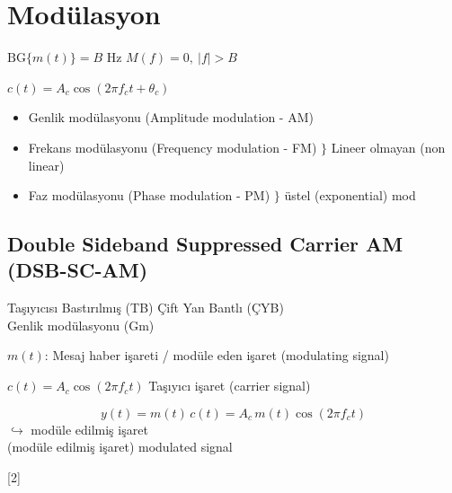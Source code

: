 \documentclass[11pt,a4paper]{article}
\begin{document}

\section{Modülasyon}

$\mathrm{BG}\{m(t)\} = B$ Hz \qquad $M(f) = 0,\ |f|>B$

$c(t) = A_c\cos(2\pi f_c t + \theta_c)$

\begin{itemize}
\item[$\ast$] Genlik modülasyonu (Amplitude modulation - AM)
\item[$\ast$] Frekans modülasyonu (Frequency modulation - FM) \quad $\Big\}$ Lineer olmayan (non linear)
\item[$\ast$] Faz modülasyonu (Phase modulation - PM) \quad $\Big\}$ üstel (exponential) mod
\end{itemize}

\subsection{Double Sideband Suppressed Carrier AM (DSB-SC-AM)}
Taşıyıcısı Bastırılmış (TB) Çift Yan Bantlı (ÇYB) \\
Genlik modülasyonu (Gm)

$m(t)$: Mesaj haber işareti / modüle eden işaret (modulating signal)

$c(t) = A_c\cos(2\pi f_c t)$ \quad Taşıyıcı işaret (carrier signal)

\[ y(t) = m(t)\,c(t) = A_c\, m(t)\cos(2\pi f_c t) \]
$\hookrightarrow$ modüle edilmiş işaret \\
(modüle edilmiş işaret) modulated signal

\begin{center}
\end{center}

[2]
\end{document}
